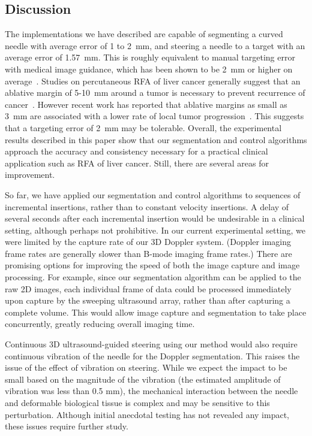 \subsection{Discussion}
The implementations we have described are capable of segmenting a curved needle with average error of 1 to 2~mm, and steering a needle to a target with an average error of 1.57~mm. This is roughly equivalent to manual targeting error with medical image guidance, which has been shown to be 2~mm or higher on average~\cite{Crocetti2008,MaierHein2008,Schubert2013}. Studies on percutaneous RFA of liver cancer generally suggest that an ablative margin of 5-10~mm around a tumor is necessary to prevent recurrence of cancer~\cite{Dodd2001,Kim2006,Gervais2009}. However recent work has reported that ablative margins as small as 3~mm are associated with a lower rate of local tumor progression~\cite{Kim2010}. This suggests that a targeting error of 2~mm may be tolerable. Overall, the experimental results described in this paper show that our segmentation and control algorithms approach the accuracy and consistency necessary for a practical clinical application such as RFA of liver cancer. Still, there are several areas for improvement.

So far, we have applied our segmentation and control algorithms to sequences of incremental insertions, rather than to constant velocity insertions. A delay of several seconds after each incremental insertion would be undesirable in a clinical setting, although perhaps not prohibitive. In our current experimental setting, we were limited by the capture rate of our 3D Doppler system. (Doppler imaging frame rates are generally slower than B-mode imaging frame rates.) There are promising options for improving the speed of both the image capture and image processing. For example, since our segmentation algorithm can be applied to the raw 2D images, each individual frame of data could be processed immediately upon capture by the sweeping ultrasound array, rather than after capturing a complete volume. This would allow image capture and segmentation to take place concurrently, greatly reducing overall imaging time. 

Continuous 3D ultrasound-guided steering using our method would also require continuous vibration of the needle for the Doppler segmentation. This raises the issue of the effect of vibration on steering. While we expect the impact to be small based on the magnitude of the vibration (the estimated amplitude of vibration was less than 0.5 mm), the mechanical interaction between the needle and deformable biological tissue is complex and may be sensitive to this perturbation. Although initial anecdotal testing has not revealed any impact, these issues require further study.

